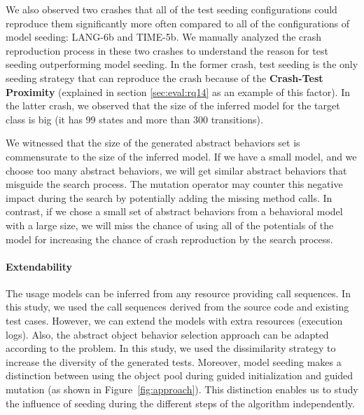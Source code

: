 We also observed two crashes that all of the test seeding configurations could reproduce them significantly more often compared to all of the configurations of model seeding: \textrm{LANG-6b} and \textrm{TIME-5b}. We manually analyzed the crash reproduction process in these two crashes to understand the reason for test seeding outperforming model seeding.
In the former crash, test seeding is the only seeding strategy that can reproduce the crash because of the \textbf{Crash-Test Proximity} (explained in section \ref{sec:eval:rq14} as an example of this factor). 
In the latter crash, we observed that the size of the inferred model for the target class is big (it has 99 states and more than 300 transitions).


We witnessed that the size of the generated abstract behaviors set is commensurate to the size of the inferred model. If we have a small model, and we choose too many abstract behaviors, we will get similar abstract behaviors that misguide the search process. The mutation operator may counter this negative impact during the search by potentially adding the missing method calls.
In contrast, if we chose a small set of abstract behaviors from a behavioral model with a large size, we will miss the chance of using all of the potentials of the model for increasing the chance of crash reproduction by the search process.

\paragraph{Extendability} The usage models can be inferred from any resource providing call sequences. In this study, we used the call sequences derived from the source code and existing test cases. However, we can extend the models with extra resources (\eg execution logs). Also, the abstract object behavior selection approach can be adapted according to the problem. In this study, we used the dissimilarity strategy to increase the diversity of the generated tests.
Moreover, model seeding makes a distinction between using the object pool during guided initialization and guided mutation (as shown in Figure~\ref{fig:approach}). This distinction enables us to study the influence of seeding during the different steps of the algorithm independently. 



